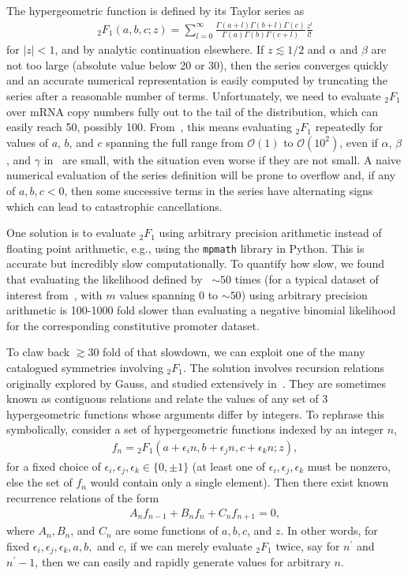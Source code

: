 The hypergeometric function is defined by its Taylor series as
\begin{align}
{_2F_1}(a,b,c;z) 
= \sum_{l=0}^\infty
\frac{\Gamma(a + l)\Gamma(b + l)\Gamma(c)}
        {\Gamma(a)\Gamma(b)\Gamma(c + l)}
\frac{z^l}{l!}
\end{align}
for $|z|<1$, and by analytic continuation elsewhere.
If $z\lesssim1/2$ and $\alpha$ and $\beta$ are not too large
(absolute value below 20 or 30),
then the series converges quickly and an accurate numerical representation is
easily computed by truncating the series after a reasonable number of terms.
Unfortunately, we need to evaluate ${_2F_1}$ over mRNA copy numbers fully out
to the tail of the distribution, which can easily reach 50, possibly 100.
From~, this means evaluating ${_2F_1}$
repeatedly for values of $a$, $b$, and $c$ spanning the full range
from $\mathcal{O}(1)$ to $\mathcal{O}(10^2)$,
even if $\alpha$, $\beta$, and $\gamma$
in~ are small,
with the situation even worse if they are not small.
A naive numerical evaluation of the series definition will be
prone to overflow and, if any of $a,b,c<0$, then some successive terms in the
series have alternating signs which can lead to catastrophic cancellations.

One solution is to evaluate ${_2F_1}$ using arbitrary precision arithmetic
instead of floating point arithmetic,
e.g., using the \texttt{mpmath} library in Python.
This is accurate but incredibly slow computationally.
To quantify how slow, we found that
evaluating the likelihood defined by~ $\sim50$ times
(for a typical dataset of interest from~\cite{Jones2014},
with $m$ values spanning 0 to $\sim50$)
using arbitrary precision arithmetic is 100-1000 fold slower than
evaluating a negative binomial likelihood for the corresponding
constitutive promoter dataset.

To claw back $\gtrsim30$ fold of that slowdown, we can exploit
one of the many catalogued symmetries involving ${_2F_1}$.
The solution involves recursion relations originally explored by Gauss,
and studied extensively in~\cite{Pearson2017, Gil2007}.
They are sometimes known as contiguous relations and relate the values
of any set of 3 hypergeometric functions whose arguments differ by integers.
To rephrase this symbolically, consider a set of hypergeometric functions
indexed by an integer $n$,
\begin{align}
f_n = {_2F_1}(a+\epsilon_i n, b+\epsilon_j n, c+\epsilon_k n; z),
\end{align}
for a fixed choice of $\epsilon_i, \epsilon_j, \epsilon_k \in \{0,\pm 1\}$
(at least one of $\epsilon_i, \epsilon_j, \epsilon_k$ must be nonzero,
else the set of $f_n$ would contain only a single element).
Then there exist known recurrence relations of the form
\begin{align}
A_n f_{n-1} + B_n f_{n} + C_n f_{n+1} = 0,
\end{align}
where $A_n, B_n$, and $C_n$ are some functions of $a,b,c$, and $z$.
In other words, for fixed $\epsilon_i, \epsilon_j, \epsilon_k, a, b,$ and $c$,
if we can merely evaluate ${_2F_1}$ twice, say for $n^\prime$ and $n^\prime-1$,
then we can easily and rapidly generate values for arbitrary $n$.

